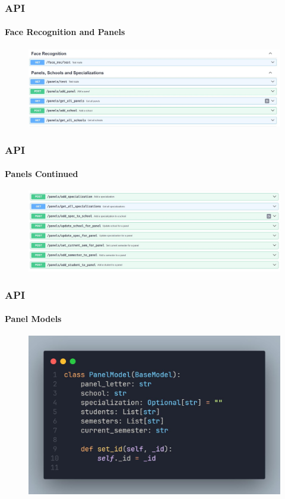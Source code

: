 \documentclass[aspectratio=169]{beamer}
\begin{document}
\begin{frame}
	\centering
	\frametitle{API}
	\framesubtitle{Face Recognition and Panels}
	\begin{minipage}{0.95\textwidth}
		\begin{figure}[H]
			\centering
			\includegraphics[width=.95\textwidth]{swagger 3.jpg}
		\end{figure}
	\end{minipage}
\end{frame}
\begin{frame}
	\centering
	\frametitle{API}
	\framesubtitle{Panels Continued}
	\begin{minipage}{0.95\textwidth}
		\begin{figure}[H]
			\centering
			\includegraphics[width=.95\textwidth]{swagger 4.jpg}
		\end{figure}
	\end{minipage}
\end{frame}
\begin{frame}
	\centering
	\frametitle{API}
	\framesubtitle{Panel Models}
	\begin{minipage}{0.95\textwidth}
		\begin{figure}[H]
			\centering
			\includegraphics[width=.65\textwidth]{panel.jpg}
		\end{figure}
	\end{minipage}
\end{frame}
\end{document}
